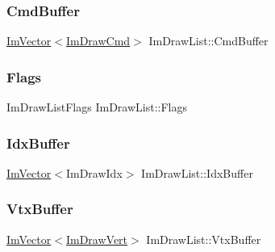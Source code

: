 \hypertarget{struct_im_draw_list_a67a4b5cc4c83bc3b81d96c46cbd38a07}{}\label{struct_im_draw_list_a67a4b5cc4c83bc3b81d96c46cbd38a07} 
\subsubsection{\texorpdfstring{Cmd\+Buffer}{CmdBuffer}}
{\footnotesize\ttfamily \hyperlink{class_im_vector}{Im\+Vector}$<$\hyperlink{struct_im_draw_cmd}{Im\+Draw\+Cmd}$>$ Im\+Draw\+List\+::\+Cmd\+Buffer}

\hypertarget{struct_im_draw_list_ada2c004661663ef875f4d4c7ec0b4557}{}\label{struct_im_draw_list_ada2c004661663ef875f4d4c7ec0b4557} 
\subsubsection{\texorpdfstring{Flags}{Flags}}
{\footnotesize\ttfamily Im\+Draw\+List\+Flags Im\+Draw\+List\+::\+Flags}

\hypertarget{struct_im_draw_list_adf292ff70a954d82daf061c609e75dfc}{}\label{struct_im_draw_list_adf292ff70a954d82daf061c609e75dfc} 
\subsubsection{\texorpdfstring{Idx\+Buffer}{IdxBuffer}}
{\footnotesize\ttfamily \hyperlink{class_im_vector}{Im\+Vector}$<$Im\+Draw\+Idx$>$ Im\+Draw\+List\+::\+Idx\+Buffer}

\hypertarget{struct_im_draw_list_aa8ff4aee39cf3c3791b7e29a7b4264be}{}\label{struct_im_draw_list_aa8ff4aee39cf3c3791b7e29a7b4264be} 
\subsubsection{\texorpdfstring{Vtx\+Buffer}{VtxBuffer}}
{\footnotesize\ttfamily \hyperlink{class_im_vector}{Im\+Vector}$<$\hyperlink{struct_im_draw_vert}{Im\+Draw\+Vert}$>$ Im\+Draw\+List\+::\+Vtx\+Buffer}

